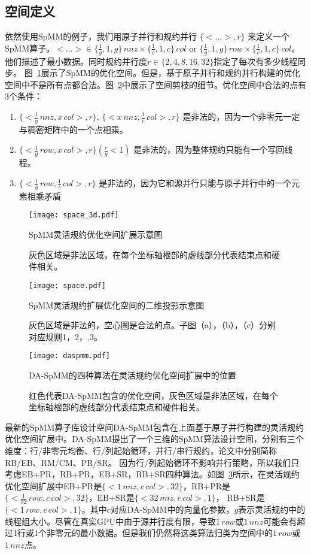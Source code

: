 \subsection{空间定义}\label{sec:spacedef}
依然使用SpMM的例子，我们用原子并行和规约并行 $\{<...>,r\}$ 来定义一个SpMM算子。$<...>\in \{\frac{1}{g},1,g\}\, nnz \times \{\frac{1}{c},1,c\}\, col $ or $\{\frac{1}{g},1,g\}\,row \times \{\frac{1}{c},1,c\}\,col$。他们描述了最小数据。同时规约并行度$r\in\{2,4,8,16,32\}$指定了每次有多少线程同步。 
图~\ref{fig:space3d}展示了SpMM的优化空间。但是，基于原子并行和规约并行构建的优化空间中不是所有点都合法。图~\ref{fig:space}中展示了空间剪枝的细节。优化空间中合法的点有3个条件：
\begin{enumerate}
  \item $\{<\frac{1}{g}\,nnz , x\,col>,r\}$, $\{<x\,nnz , \frac{1}{c}\,col>,r\}$ 
  是非法的，因为一个非零元一定与稠密矩阵中的一个点相乘。
  \item $\{<\frac{1}{g}\,row, x\,col>,r\}(\frac{r}{g}<1)$
  是非法的，因为整体规约只能有一个写回线程。
  \item $\{<\frac{1}{g}\,row , \frac{1}{c}\,col>,r\}$
  是非法的，因为它和源并行只能与原子并行中的一个元素相乘矛盾
\end{enumerate}
\begin{figure}[h]%
  \centering
  \texttt{[image: space\_3d.pdf]}
  \caption{SpMM灵活规约优化空间扩展示意图}
  \caption*{灰色区域是非法区域，在每个坐标轴根部的虚线部分代表结束点和硬件相关。}
  \label{fig:space3d}
\end{figure}
\begin{figure}[h]%
  \centering
  \texttt{[image: space.pdf]}
  \caption{SpMM灵活规约扩展优化空间的二维投影示意图}
  \caption*{灰色区域是非法的，空心圈是合法的点。子图（a），（b），（c）分别对应规则1，2，,3。}
  \label{fig:space}
\end{figure}
\begin{figure}[h]%
  \centering
  \texttt{[image: daspmm.pdf]}
  \caption{DA-SpMM的四种算法在灵活规约优化空间扩展中的位置}
  \caption*{红色代表DA-SpMM包含的优化空间，灰色区域是非法区域，在每个坐标轴根部的虚线部分代表结束点和硬件相关。}
  \label{fig:daspmm}
\end{figure}
最新的SpMM算子库设计空间DA-SpMM包含在上面基于原子并行构建的灵活规约优化空间扩展中。DA-SpMM提出了一个三维的SpMM算法设计空间，分别有三个维度：行/非零元均衡、行/列起始循环，并行/串行规约，论文中分别简称RB/EB、RM/CM、PR/SR。
因为行/列起始循环不影响并行策略，所以我们只考虑EB+PR，RB+PR，EB+SR，RB+SR四种算法。如图~\ref{fig:daspmm}所示，在灵活规约优化空间扩展中EB+PR是$\{<1\,nnz , c\,col>,32\}$，RB+PR是$\{<\frac{1}{32}\,row, c\,col>,32\}$，EB+SR是$\{<32\,nnz,c\,col >,1\}$，
RB+SR是$\{<1\,row,c\,col >,1\}$。其中$c$对应DA-SpMM中的向量化参数，$g$表示灵活规约中的线程组大小。尽管在真实GPU中由于源并行度有限，导致$1\,row$或$1\,nnz$可能会有超过1行或1个非零元的最小数据。但是我们仍然将这类算法归类为空间中的$1\,row$或$1\,nnz$点。


